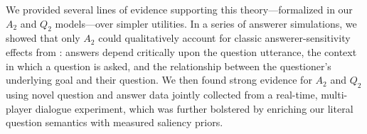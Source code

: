 \documentclass[12pt, floatsintext, jou]{apa6}
\begin{document}
We provided several lines of evidence supporting this theory---formalized in our $A_2$ and $Q_2$ models---over simpler utilities. In a series of answerer simulations, we showed that only $A_2$ could qualitatively account for classic answerer-sensitivity effects from : answers depend critically upon the question utterance, the context in which a question is asked, and the relationship between the questioner's underlying goal and their question. We then found strong evidence for $A_2$ and $Q_2$ using novel question and answer data jointly collected from a real-time, multi-player dialogue experiment, which was further bolstered by enriching our literal question semantics with measured saliency priors. %


\end{document}
